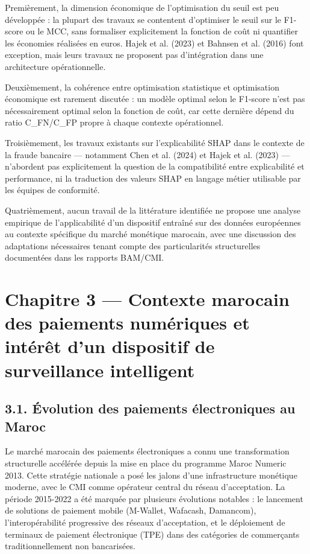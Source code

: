 Premièrement, la dimension économique de l'optimisation du seuil est peu développée : la plupart des travaux se contentent d'optimiser le seuil sur le F1-score ou le MCC, sans formaliser explicitement la fonction de coût ni quantifier les économies réalisées en euros. Hajek et al. (2023) et Bahnsen et al. (2016) font exception, mais leurs travaux ne proposent pas d'intégration dans une architecture opérationnelle.

Deuxièmement, la cohérence entre optimisation statistique et optimisation économique est rarement discutée : un modèle optimal selon le F1-score n'est pas nécessairement optimal selon la fonction de coût, car cette dernière dépend du ratio C\_FN/C\_FP propre à chaque contexte opérationnel.

Troisièmement, les travaux existants sur l'explicabilité SHAP dans le contexte de la fraude bancaire — notamment Chen et al. (2024) et Hajek et al. (2023) — n'abordent pas explicitement la question de la compatibilité entre explicabilité et performance, ni la traduction des valeurs SHAP en langage métier utilisable par les équipes de conformité.

Quatrièmement, aucun travail de la littérature identifiée ne propose une analyse empirique de l'applicabilité d'un dispositif entraîné sur des données européennes au contexte spécifique du marché monétique marocain, avec une discussion des adaptations nécessaires tenant compte des particularités structurelles documentées dans les rapports BAM/CMI.

\chapter{Chapitre 3 — Contexte marocain des paiements numériques et intérêt d'un dispositif de surveillance intelligent}

\section{3.1. Évolution des paiements électroniques au Maroc}

Le marché marocain des paiements électroniques a connu une transformation structurelle accélérée depuis la mise en place du programme Maroc Numeric 2013. Cette stratégie nationale a posé les jalons d'une infrastructure monétique moderne, avec le CMI comme opérateur central du réseau d'acceptation. La période 2015-2022 a été marquée par plusieurs évolutions notables : le lancement de solutions de paiement mobile (M-Wallet, Wafacash, Damancom), l'interopérabilité progressive des réseaux d'acceptation, et le déploiement de terminaux de paiement électronique (TPE) dans des catégories de commerçants traditionnellement non bancarisées.

